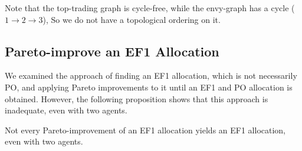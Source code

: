 \documentclass[sigconf]{aamas}
\theoremstyle{definition}
\begin{document}
Note that the top-trading graph is cycle-free, while the envy-graph has a cycle ($1\rightarrow 2 \rightarrow 3$), So we do not have a topological ordering on it. 


\subsection{Pareto-improve an EF1 Allocation}
We examined the approach of finding an EF1 allocation, which is not necessarily PO, and applying Pareto improvements to it until an EF1 and PO allocation is obtained. However, the following proposition shows that this approach is inadequate, even with two agents.

\begin{proposition}
Not every Pareto-improvement of an EF1 allocation yields an EF1 allocation, even with two agents. 
\end{proposition} 
\end{document}
